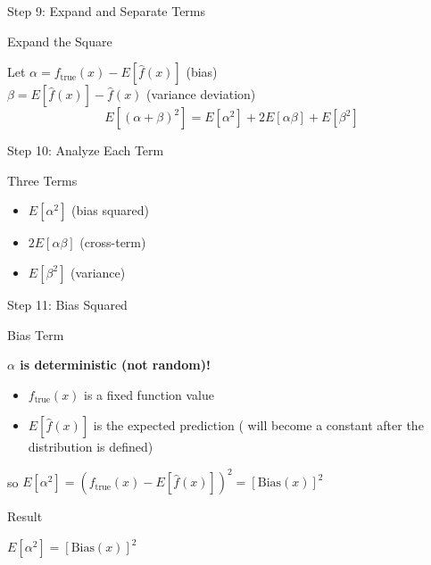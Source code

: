 \documentclass[10pt]{beamer}
\begin{document}
\begin{frame}{Step 9: Expand and Separate Terms}
\small
\begin{examplebox}{Expand the Square}
\raggedright
Let $\alpha = f_{\text{true}}(x) - E[\hat{f}(x)]$ (bias)\\
$\beta = E[\hat{f}(x)] - \hat{f}(x)$ (variance deviation)
$$E[(\alpha + \beta)^2] = E[\alpha^2] + 2E[\alpha\beta] + E[\beta^2]$$
\end{examplebox}
\end{frame}

\begin{frame}{Step 10: Analyze Each Term}
\small
\begin{definitionbox}{Three Terms}
\raggedright
\begin{itemize}
\item $E[\alpha^2]$ (bias squared)
\item $2E[\alpha\beta]$ (cross-term)
\item $E[\beta^2]$ (variance)
\end{itemize}
\end{definitionbox}
\end{frame}

\begin{frame}{Step 11: Bias Squared}
\small
\begin{keypointsbox}{Bias Term}
\raggedright
\textbf{$\alpha$ is deterministic (not random)!}
\begin{itemize}
\item $f_{\text{true}}(x)$ is a fixed function value
\item $E[\hat{f}(x)]$ is the expected prediction ( will become a constant after the distribution is defined)
\end{itemize}    
so $E[\alpha^2] = (f_{\text{true}}(x) - E[\hat{f}(x)])^2 = [\text{Bias}(x)]^2$
\end{keypointsbox}

\begin{alertbox}{Result}
\raggedright
$\boxed{E[\alpha^2] = [\text{Bias}(x)]^2}$
\end{alertbox}
\end{frame}


\end{document}
